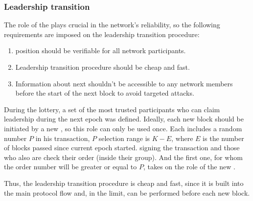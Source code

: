 \subsubsection{Leadership transition}\label{subsubsec:leadership-transition}
The role of the  plays crucial in the network's reliability, so the following requirements are imposed on the leadership transition procedure:
\begin{enumerate}
    \item {} position should be verifiable for all network participants.
    \item Leadership transition procedure should be cheap and fast.
    \item Information about next  shouldn't be accessible to any network members before the start of the next block to avoid targeted attacks.
\end{enumerate}
During the lottery, a set of the most trusted participants who can claim leadership during the next epoch was defined.
Ideally, each new block should be initiated by a new , so this role can only be used once.
Each  includes a random number $P$ in his transaction, $P$ selection range is ${K - E}$, where $E$ is the number of blocks passed since current epoch started.
 signing the  transaction and those who also are  check their order (inside their group).
And the first one, for whom the order number will be greater or equal to $P$, takes on the role of the new .

Thus, the leadership transition procedure is cheap and fast, since it is built into the main protocol flow and, in the limit, can be performed before each new block.